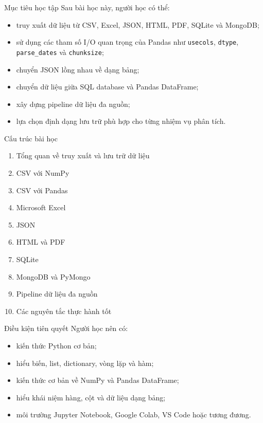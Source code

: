 \documentclass[aspectratio=169,11pt]{beamer}
\newcommand{\code}[1]{\texttt{#1}}
\begin{document}
\begin{frame}{Mục tiêu học tập}
Sau bài học này, người học có thể:
\begin{itemize}
  \item truy xuất dữ liệu từ CSV, Excel, JSON, HTML, PDF, SQLite và MongoDB;
  \item sử dụng các tham số I/O quan trọng của Pandas như \code{usecols}, \code{dtype}, \code{parse\_dates} và \code{chunksize};
  \item chuyển JSON lồng nhau về dạng bảng;
  \item chuyển dữ liệu giữa SQL database và Pandas DataFrame;
  \item xây dựng pipeline dữ liệu đa nguồn;
  \item lựa chọn định dạng lưu trữ phù hợp cho từng nhiệm vụ phân tích.
\end{itemize}
\end{frame}

\begin{frame}{Cấu trúc bài học}
\begin{enumerate}
  \item Tổng quan về truy xuất và lưu trữ dữ liệu
  \item CSV với NumPy
  \item CSV với Pandas
  \item Microsoft Excel
  \item JSON
  \item HTML và PDF
  \item SQLite
  \item MongoDB và PyMongo
  \item Pipeline dữ liệu đa nguồn
  \item Các nguyên tắc thực hành tốt
\end{enumerate}
\end{frame}

\begin{frame}{Điều kiện tiên quyết}
Người học nên có:
\begin{itemize}
  \item kiến thức Python cơ bản;
  \item hiểu biến, list, dictionary, vòng lặp và hàm;
  \item kiến thức cơ bản về NumPy và Pandas DataFrame;
  \item hiểu khái niệm hàng, cột và dữ liệu dạng bảng;
  \item môi trường Jupyter Notebook, Google Colab, VS Code hoặc tương đương.
\end{itemize}
\end{frame}
\end{document}
